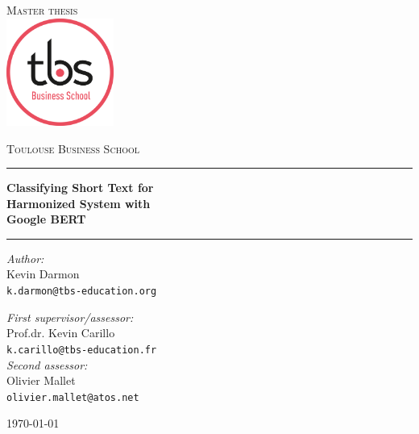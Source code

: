 \documentclass[11pt,a4paper]{report}
\begin{document}
\begin{titlepage}
\begin{center}
\textsc{\LARGE Master thesis}\\[1.5cm]
\includegraphics[height=100pt]{tbs_logo_2019.png}

\vspace{0.4cm}
\textsc{\Large Toulouse Business School}\\[1cm]
\hrule
\vspace{0.4cm}
\textbf{\huge Classifying Short Text for \\Harmonized System with \\Google BERT\\[0.3cm]
\LARGE }
\hrule
\vspace{2cm}
\begin{minipage}[t]{0.52\textwidth}
\begin{flushleft} \large
\textit{Author:}\\
Kevin Darmon\\
\texttt{k.darmon@tbs-education.org}\\[1.3cm]
\end{flushleft}
\end{minipage}
\begin{minipage}[t]{0.45\textwidth}
\begin{flushright} \large
\textit{First supervisor/assessor:}\\
Prof.dr. Kevin Carillo\\
\texttt{k.carillo@tbs-education.fr}\\[1.3cm]
\textit{Second assessor:}\\
Olivier Mallet\\
\texttt{olivier.mallet@atos.net}
\end{flushright}
\end{minipage}
\vfill
{\large \today}
\end{center}
\end{titlepage}



\tableofcontents








\appendix

\end{document}
